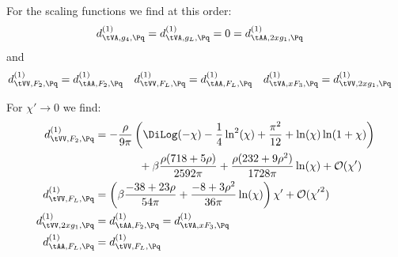 For the scaling functions we find at this order:
\begin{align}
d_{\tVA,g_4,\Pq}^{(1)} &= d_{\tVA,g_L,\Pq}^{(1)} = 0 = d_{\tAA,2xg_1,\Pq}^{(1)}
\end{align}
and
\begin{align}
d_{\tVV,F_2,\Pq}^{(1)} &= d_{\tAA,F_2,\Pq}^{(1)} 
&d_{\tVV,F_L,\Pq}^{(1)} &= d_{\tAA,F_L,\Pq}^{(1)} 
&d_{\tVA,xF_3,\Pq}^{(1)} &= d_{\tVV,2xg_1,\Pq}^{(1)} 
\end{align}

For $\chi'\to 0$ we find:
\begin{align}
d_{\tVV,F_2,\Pq}^{(1)} &= -\frac{\rho}{9\pi}\left(\DiLog(-\chi) - \frac 1 4 \ln^2(\chi) + \frac{\pi^2}{12} + \ln(\chi)\ln(1+\chi)\right) \nonumber\\
 &\hspace{40pt} + \beta\frac{\rho(718+5\rho)}{2592\pi} + \frac{\rho(232+9\rho^2)}{1728\pi}\ln(\chi) + \mathcal O(\chi')\\
d_{\tVV,F_L,\Pq}^{(1)} &= \left(\beta\frac{-38+23\rho}{54\pi} + \frac{-8+3\rho^2}{36\pi}\ln(\chi)\right)\chi' + \mathcal O({\chi'}^2) \\
d_{\tVV,2xg_1,\Pq}^{(1)} &= d_{\tAA,F_2,\Pq}^{(1)} = d_{\tVA,xF_3,\Pq}^{(1)}\\
d_{\tAA,F_L,\Pq}^{(1)} &= d_{\tVV,F_L,\Pq}^{(1)}
\end{align}

